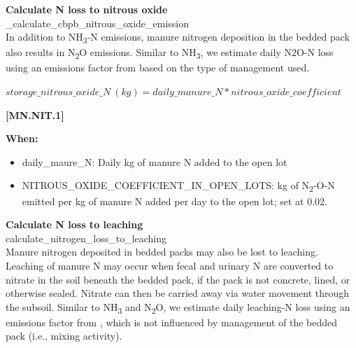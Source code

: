 \begin{refsection}
    \textbf{Calculate N loss to nitrous oxide}\\
    \_calculate\_cbpb\_nitrous\_oxide\_emission\\

    In addition to NH\textsubscript{3}-N emissions, manure nitrogen deposition in the bedded pack also results in N\textsubscript{2}O emissions. Similar to NH\textsubscript{3}, we estimate daily N2O-N loss using an emissions factor from \cite{Hanson2024} based on the type of management used. 
            \vspace{0.5cm}        
    
    \begin{center}
        \(storage\_nitrous\_oxide\_N\ (kg) = daily\_manure\_N * nitrous\_oxide\_coefficient\)
    \end{center}
        \vspace{0.5cm} 
    
            {\raggedleft \textbf{[MN.NIT.1]}\par}
            \vspace{0.5cm} 
            
    \textbf{When:}

    \begin{itemize}
        \item daily\_maure\_N: Daily kg of manure N added to the open lot
        \item NITROUS\_OXIDE\_COEFFICIENT\_IN\_OPEN\_LOTS: kg of N\textsubscript{2}-O-N emitted per kg of manure N added per day to the open lot; set at 0.02.
    \end{itemize}
    \vspace{0.5cm}
            
    \textbf{Calculate N loss to leaching}\\
    calculate\_nitrogen\_loss\_to\_leaching\\

    Manure nitrogen deposited in bedded packs may also be lost to leaching. Leaching of manure N may occur when fecal and urinary N are converted to nitrate in the soil beneath the bedded pack, if the pack is not concrete, lined, or otherwise sealed. Nitrate can then be carried away via water movement through the subsoil. Similar to NH\textsubscript{3} and N\textsubscript{2}O, we estimate daily leaching-N loss using an emissions factor from \cite{Hanson2024}, which is not influenced by management of the bedded pack (i.e., mixing activity). 
            \vspace{0.5cm}        
    

\end{refsection}
